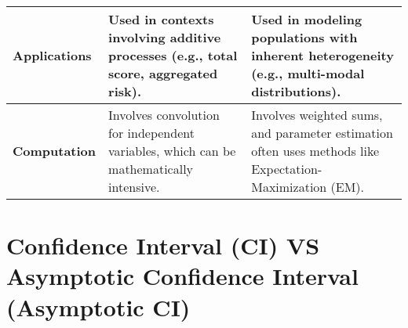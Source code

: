 \begin{alternateColorTable}
\begin{longtable}{|p{2.5cm}|p{5cm}|p{5cm}|}
    \textbf{Applications} & 
    Used in contexts involving additive processes (e.g., total score, aggregated risk). & 
    Used in modeling populations with inherent heterogeneity (e.g., multi-modal distributions). \\
    \hline
    
    \textbf{Computation} & 
    Involves convolution for independent variables, which can be mathematically intensive. & 
    Involves weighted sums, and parameter estimation often uses methods like Expectation-Maximization (EM). \\
    \hline

\end{longtable}
\end{alternateColorTable}

\section{Confidence Interval (CI) VS Asymptotic Confidence Interval (Asymptotic CI) \cite{chatgpt}} \label{Confidence Interval (CI) VS Asymptotic Confidence Interval (Asymptotic CI)}

